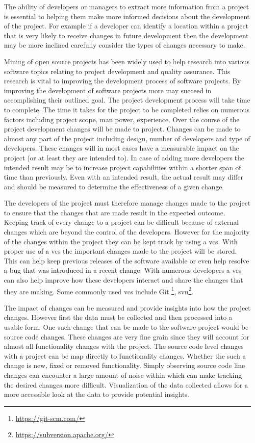 The ability of developers or managers to extract more information from a project is essential to helping them make more informed decisions about the development of the project. For example if a developer can identify a location within a project that is very likely to receive changes in future development then the development may be more inclined carefully consider the types of changes necessary to make.

Mining of open source projects has been widely used to help research into various software topics relating to project development and quality assurance. This research is vital to improving the development process of software projects. By improving the development of software projects more may succeed in accomplishing their outlined goal. The project development process will take time to complete. The time it takes for the project to be completed relies on numerous factors including project scope, man power, experience. Over the course of the project development changes will be made to project. Changes can be made to almost any part of the project including design, number of developers and type of developers. These changes will in most cases have a measurable impact on the project (or at least they are intended to). In case of adding more developers the intended result may be to increase project capabilities within a shorter span of time than previously. Even with an intended result, the actual result may differ and should be measured to determine the effectiveness of a given change.

The developers of the project must therefore manage changes made to the project to ensure that the changes that are made result in the expected outcome. Keeping track of every change to a project can be difficult because of external changes which are beyond the control of the developers. However for the majority of the changes within the project they can be kept track by using a \gls{vcs}. With proper use of a \gls{vcs} the important changes made to the project will be stored. This can help keep previous releases of the software available or even help resolve a bug that was introduced in a recent change. With numerous developers a \gls{vcs} can also help improve how these developers interact and share the changes that they are making. Some commonly used \gls{vcs} include Git \footnote{\url{https://git-scm.com/}}, \gls{svn}\footnote{\url{https://subversion.apache.org/}}.

The impact of changes can be measured and provide insights into how the project changes. However first the data must be collected and then processed into a usable form. One such change that can be made to the software project would be source code changes. These changes are very fine grain since they will account for almost all functionality changes with the project. The source code level changes with a project can be map directly to functionality changes. Whether the such a change is new, fixed or removed functionality. Simply observing source code line changes can encounter a large amount of noise within which can make tracking the desired changes more difficult. Visualization of the data collected allows for a more accessible look at the data to provide potential insights.


